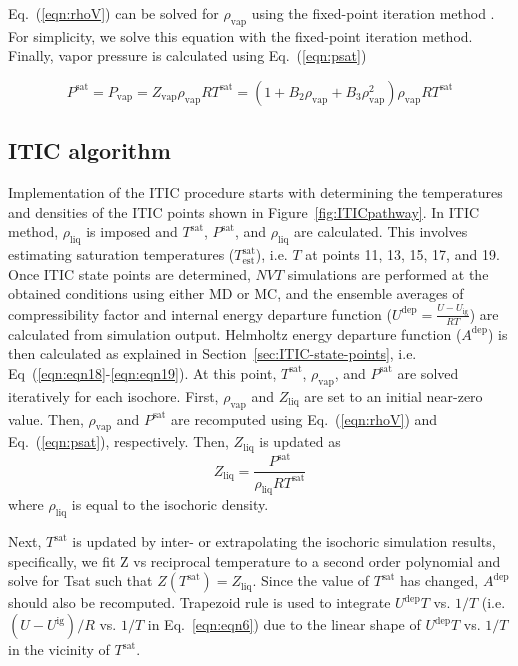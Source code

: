 \documentclass[5p,times]{elsarticle}
\begin{document}
Eq.~(\ref{eqn:rhoV}) can be solved for $\rho_\mathrm{vap}$ using the fixed-point iteration method \cite{Burden1985}. For simplicity, we solve this equation with the fixed-point iteration method. Finally, vapor pressure is calculated using Eq.~(\ref{eqn:psat})

\begin{equation}
P^\mathrm{sat} = P_\mathrm{vap} = {Z_\mathrm{vap}}{\rho _\mathrm{vap}}RT^\mathrm{sat} = (1 + {B_2} {\rho_\mathrm{vap}} + {B_3}\rho _\mathrm{vap}^2){\rho _\mathrm{vap}}RT^\mathrm{sat} 
\label{eqn:psat}
\end{equation}



\subsection{ITIC algorithm}
Implementation of the ITIC procedure starts with determining the temperatures and densities of the ITIC points shown in Figure~\ref{fig:ITICpathway}. In ITIC method, $\rho_\mathrm{liq}$ is imposed and $T^\mathrm{sat}$, $P^\mathrm{sat}$, and $\rho_\mathrm{liq}$ are calculated. This involves estimating saturation temperatures ($T^\mathrm{sat}_\mathrm{est}$), i.e. $T$ at points 11, 13, 15, 17, and 19. Once ITIC state points are determined, $NVT$ simulations are performed at the obtained conditions using either MD or MC, and the ensemble averages of compressibility factor and internal energy departure function ($U^\mathrm{dep}=\frac{U-U_\mathrm{ig}}{RT}$) are calculated from simulation output. Helmholtz energy departure function ($A^\mathrm{dep}$) is then calculated as explained in Section~\ref{sec:ITIC-state-points}, i.e. Eq~(\ref{eqn:eqn18}-\ref{eqn:eqn19}). At this point, $T^\mathrm{sat}$, $\rho_\mathrm{vap}$, and $P^\mathrm{sat}$ are solved iteratively for each isochore. First, $\rho_\mathrm{vap}$ and $Z_\mathrm{liq}$ are set to an initial near-zero value. Then, $\rho_\mathrm{vap}$ and $P^\mathrm{sat}$ are recomputed using Eq.~(\ref{eqn:rhoV}) and Eq.~(\ref{eqn:psat}), respectively. Then, $Z_\mathrm{liq}$ is updated as 
\begin{equation}
{Z_{\mathrm{liq}}} = \frac{P^\mathrm{sat}}{\rho_\mathrm{liq}RT^\mathrm{sat}}  
\label{eqn:zliq}
\end{equation}
where $\rho_\mathrm{liq}$ is equal to the isochoric density.

Next, $T^\mathrm{sat}$ is updated by inter- or extrapolating the isochoric simulation results, specifically, we fit Z vs reciprocal temperature to a second order polynomial and solve for Tsat such that $Z(T^\mathrm{sat})=Z_\mathrm{liq}$. 
Since the value of $T^\mathrm{sat}$ has changed, $A^\mathrm{dep}$ should also be recomputed. Trapezoid rule is used to integrate $U^\mathrm{dep}T$ vs. $1/T$ (i.e. $(U-U^\mathrm{ig})/R$ vs. $1/T$ in Eq.~\ref{eqn:eqn6}) due to the linear shape of $U^\mathrm{dep}T$ vs. $1/T$ in the vicinity of $T^\mathrm{sat}$.
\end{document}
